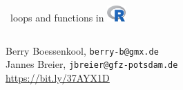 \documentclass[xcolor=table,      handout ,    xcolor=dvipsnames]{beamer}\usepackage[]{graphicx}\usepackage[]{color}
\begin{document}








{
\begin{frame}
\begin{center}
    \begin{columns}
    \column{15em}
    \begin{block}{}{\Large ~loops and functions in \includegraphics[width=0.7cm]{externalfig/Rlogo.png}}
    \end{block}
    \end{columns}
\vspace{1em}
Berry Boessenkool, \texttt{berry-b@gmx.de}\\
Jannes Breier, \texttt{jbreier@gfz-potsdam.de}\\[1em]
\href{https://gitext.gfz-potsdam.de/swc-bb/swc-lessons/2019-11-26-potsdam-berlin/R/tree/master/_episodes_rmd/data}{https://bit.ly/37AYX1D}\\[1em]

\end{center}
\end{frame}}
\end{document}
